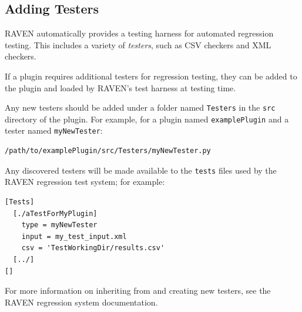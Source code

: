 \subsection{Adding Testers}
RAVEN automatically provides a testing harness for automated regression testing. This includes a
variety of \emph{testers}, such as CSV checkers and XML checkers.

If a plugin requires additional testers for regression testing, they can be added to the plugin and
loaded by RAVEN's test harness at testing time.

Any new testers should be added under a folder named \texttt{Testers} in the \texttt{src} directory
of the plugin. For example, for a plugin named \texttt{examplePlugin} and a tester named
\texttt{myNewTester}:
\begin{lstlisting}[morekeywords={examplePlugin,myNewTester}]
  /path/to/examplePlugin/src/Testers/myNewTester.py
\end{lstlisting}
Any discovered testers will be made available to the \texttt{tests} files used by the RAVEN
regression test system; for example:
\begin{lstlisting}[morekeywords={myNewTester}]
[Tests]
  [./aTestForMyPlugin]
    type = myNewTester
    input = my_test_input.xml
    csv = 'TestWorkingDir/results.csv'
  [../]
[]
\end{lstlisting}

For more information on inheriting from and creating new testers, see the RAVEN regression system
documentation.
